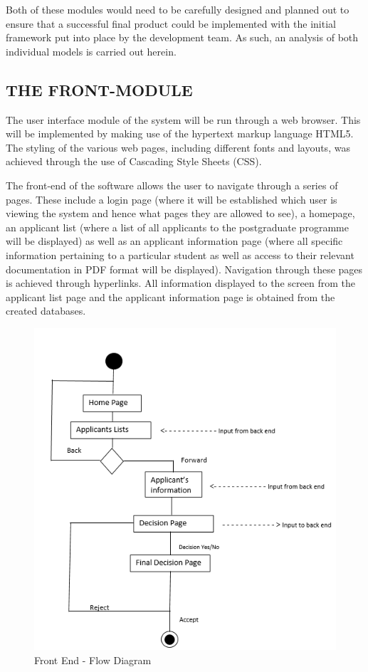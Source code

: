 \documentclass[journal,comsoc,onecolumn]{IEEEtran}
\begin{document}
\hfill \break Both of these modules would need to be carefully designed and planned out to ensure that a successful final product could be implemented with the initial framework put into place by the development team. As such, an analysis of both individual models is carried out herein.


\subsection{THE FRONT-MODULE}

The user interface module of the system will be run through a web browser. This will be implemented by making use of the hypertext markup language HTML5. The styling of the various web pages, including different fonts and layouts, was achieved through the use of Cascading Style Sheets (CSS).

\hfill \break The front-end of the software allows the user to navigate through a series of pages. These include a login page (where it will be established which user is viewing the system and hence what pages they are allowed to see), a homepage, an applicant list (where a list of all applicants to the postgraduate programme will be displayed) as well as an applicant information page (where all specific information pertaining to a particular student as well as access to their relevant documentation in PDF format will be displayed). Navigation through these pages is achieved through hyperlinks. All information displayed to the screen from the applicant list page and the applicant information page is obtained from the created databases. 

\begin{figure}[hbt!]
	\centering
	\includegraphics[width=0.7\linewidth]{"Front End - Flow Diagram"}
	\caption{Front End - Flow Diagram}
	\label{fig:FrontEnd-FlowDiagram}
\end{figure}
\end{document}
